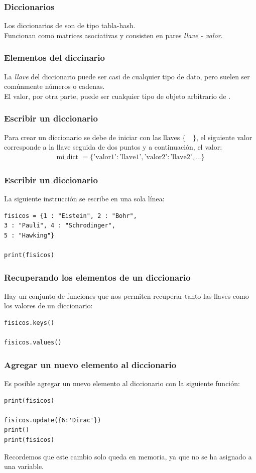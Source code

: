 \documentclass[12pt]{beamer}
\begin{document}
\begin{frame}
\frametitle{Diccionarios}
Los diccionarios de \python{} son de tipo tabla-hash.
\\
\bigskip
\pause
Funcionan como matrices asociativas y consisten en pares \emph{\textcolor{cadmiumred}{llave} - \textcolor{cadmiumgreen}{valor}}.
\end{frame}
\begin{frame}
\frametitle{Elementos del diccinario}
La \emph{\textcolor{cadmiumred}{llave}} del diccionario puede ser casi de cualquier tipo de dato, pero suelen ser comúnmente números o cadenas.
\\
\bigskip
\pause
El \textcolor{cadmiumgreen}{valor}, por otra parte, puede ser cualquier tipo de objeto arbitrario de \python.
\end{frame}
\begin{frame}[fragile]
\frametitle{Escribir un diccionario}
Para crear un diccionario se debe de iniciar con las llaves $\{ \quad \}$, \pause el siguiente valor corresponde a la llave seguida de dos puntos y a continuación, el valor:
\\
\bigskip
\pause
\begin{align*}
\mbox{mi\_dict } = \{ \mbox{'valor1'} : \mbox{'llave1'}, \mbox{'valor2'} : \mbox{'llave2'} , \ldots \} 
\end{align*}
\end{frame}
\begin{frame}[fragile]
\frametitle{Escribir un diccionario}
La siguiente instrucción se escribe en una sola línea:
\pause
\begin{lstlisting}[caption=Escribiendo un diccionario]
fisicos = {1 : "Eistein", 2 : "Bohr", 
3 : "Pauli", 4 : "Schrodinger", 
5 : "Hawking"}

print(fisicos)
\end{lstlisting}
\end{frame}
\begin{frame}[fragile]
\frametitle{Recuperando los elementos de un diccionario}
Hay un conjunto de funciones que nos permiten recuperar tanto las llaves como los valores de un diccionario:
\pause
\begin{lstlisting}[caption=Recuperando el contenido de un diccionario]
fisicos.keys()

fisicos.values()
\end{lstlisting}
\end{frame}
\begin{frame}[fragile]
\frametitle{Agregar un nuevo elemento al diccionario}
Es posible agregar un nuevo elemento al diccionario con la siguiente función:
\pause
\begin{lstlisting}[caption=Agregando un elemento al diccionario]
print(fisicos)

fisicos.update({6:'Dirac'})
print()
print(fisicos)
\end{lstlisting}
\pause
Recordemos que este cambio solo queda en memoria, ya que no se ha asignado a una variable.
\end{frame}
\end{document}
